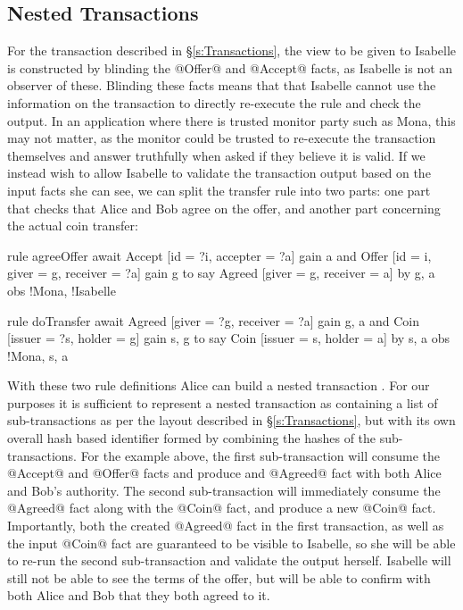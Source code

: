 \subsection{Nested Transactions}
For the transaction described in \S\ref{s:Transactions}, the view to be given to Isabelle is constructed by blinding the @Offer@ and @Accept@ facts, as Isabelle is not an observer of these. Blinding these facts means that that Isabelle cannot use the information on the transaction to directly re-execute the rule and check the output. In an application where there is trusted monitor party such as Mona, this may not matter, as the monitor could be trusted to re-execute the transaction themselves and answer truthfully when asked if they believe it is valid. If we instead wish to allow Isabelle to validate the transaction output based on the input facts she can see, we can split the transfer rule into two parts: one part that checks that Alice and Bob agree on the offer, and another part concerning the actual coin transfer:

\begin{small}
\begin{code}
  rule  agreeOffer
  await Accept [id = ?i, accepter = ?a]            gain {a}
    and Offer  [id = i,  giver = g, receiver = ?a] gain {g}
  to
   say  Agreed [giver = g,   receiver = a]
    by  {g, a} obs {!Mona, !Isabelle}

  rule  doTransfer
  await Agreed [giver  = ?g, receiver = ?a] gain {g, a}
   and  Coin   [issuer = ?s, holder   = g]  gain {s, g}
  to
   say  Coin   [issuer = s,  holder   = a]
    by  {s, a} obs {!Mona, s, a}
\end{code}
\end{small}

With these two rule definitions Alice can build a nested transaction \CITE. For our purposes it is sufficient to represent a nested transaction as containing a list of sub-transactions as per the layout described in \S\ref{s:Transactions}, but with its own overall hash based identifier formed by combining the hashes of the sub-transactions. For the example above, the first sub-transaction will consume the @Accept@ and @Offer@ facts and produce and @Agreed@ fact with both Alice and Bob's authority. The second sub-transaction will immediately consume the @Agreed@ fact along with the @Coin@ fact, and produce a new @Coin@ fact. Importantly, both the created @Agreed@ fact in the first transaction, as well as the input @Coin@ fact are guaranteed to be visible to Isabelle, so she will be able to re-run the second sub-transaction and validate the output herself. Isabelle will still not be able to see the terms of the offer, but will be able to confirm with both Alice and Bob that they both agreed to it.

